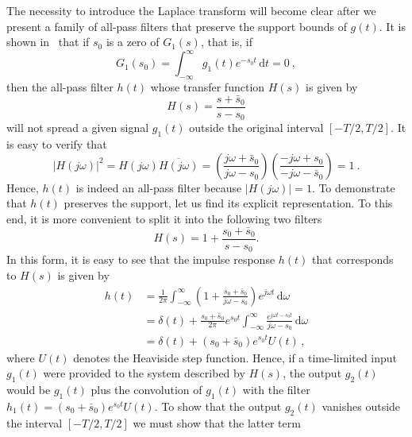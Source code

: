 The necessity to introduce the Laplace transform will become clear
after we present a family of all-pass filters that preserve the
support bounds of $g(t)$.  It is shown
in~ that if $s_{0}$ is a zero of
$G_{1}(s)$, that is, if 
\begin{equation}
  \label{eq:17}
  G_{1}(s_{0}) = \int_{-\infty}^{\infty}g_{1}(t)e^{-s_{0}t}\,
  \mathrm{d}t = 0 \ ,
\end{equation}
then the all-pass filter $h(t)$ whose transfer function $H(s)$ is
given by
\begin{equation}
  \label{eq:20}
  H(s) = \frac{s+\bar{s}_{0}}{s - s_{0}}
\end{equation}
will not spread a given signal $g_{1}(t)$ outside the original
interval $[-T/2, T/2]$. It is easy to verify that
\begin{equation}
  \label{eq:32}
  |H(j\omega)|^{2} = H(j\omega)\overline{H(j\omega)} =
  \left(
    \frac{j\omega+\bar s_{0}}{j\omega - s_{0}}
  \right)
  \left(
    \frac{-j\omega + s_{0}}{-j\omega - \bar s_{0}}
  \right)  = 1 \ .
\end{equation}
Hence, $h(t)$ is indeed an all-pass filter because $|H(j\omega)| = 1$. To
demonstrate that $h(t)$ preserves the support, let us find its
explicit representation. To this end, it is more convenient to split
it into the following two filters
\begin{equation}
  \label{eq:33}
  H(s) = 1 + \frac{s_{0} + \bar s_{0}}{s - s_{0}}.
\end{equation}
In this form, it is easy to see that the impulse response $h(t)$ that
corresponds to $H(s)$ is given by
\begin{align}
  \label{eq:34}
  h(t)
  & = \frac{1}{2\pi}\int_{-\infty}^{\infty}
  \left(
    1 + \frac{s_{0} + \bar s_{0}}{j\omega - s_{0}}
  \right) e^{j\omega t}\, \mathrm{d} \omega\\
  & = \delta(t) + \frac{s_{0} + \bar s_{0}}{2\pi}
  e^{s_{0}t}\int_{-\infty}^{\infty}
  \frac{e^{j\omega t - s_{0}t}}{j\omega  - s_{0}}\, \mathrm{d}
  \omega\\
  & = \delta(t) + (s_{0} + \bar s_{0})e^{s_{0}t}U(t)\, ,
\end{align}
where $U(t)$ denotes the Heaviside step function. Hence, if a
time-limited input $g_{1}(t)$ were provided to the system described by
$H(s)$, the output $g_{2}(t)$ would be $g_{1}(t)$ plus the convolution
of $g_{1}(t)$ with the filter $h_{1}(t) = (s_{0} +
\bar s_{0})e^{s_{0}t}U(t)$. To show that the output $g_{2}(t)$ vanishes
outside the interval $[-T/2,T/2]$ we must show that the latter term
